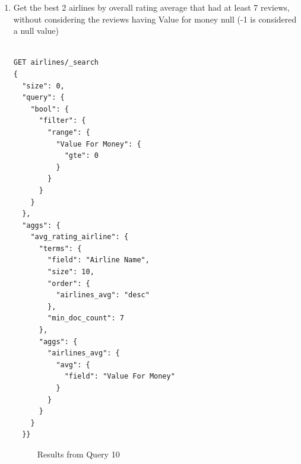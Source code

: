 \documentclass{Configuration_Files/PoliMi3i_thesis}
\begin{document}
\begin{enumerate}
\begin{figure}[H]
\end{figure}

\newpage
    
    \item Get the best 2 airlines by overall rating average that had at least 7 reviews, without considering the reviews having Value for money null (-1 is considered a null value)

    \begin{verbatim}
        
GET airlines/_search
{
  "size": 0,
  "query": {
    "bool": {
      "filter": {
        "range": {
          "Value For Money": {
            "gte": 0
          }
        }
      }
    }
  },
  "aggs": {
    "avg_rating_airline": {
      "terms": {
        "field": "Airline Name",
        "size": 10,
        "order": {
          "airlines_avg": "desc"
        },
        "min_doc_count": 7
      },
      "aggs": {
        "airlines_avg": {
          "avg": {
            "field": "Value For Money"
          }
        }
      }
    }
  }}
\end{verbatim}
\begin{figure}[H]
    \centering
    \quad
    \caption{Results from Query 10}

\end{figure}
\end{enumerate}
\end{document}
